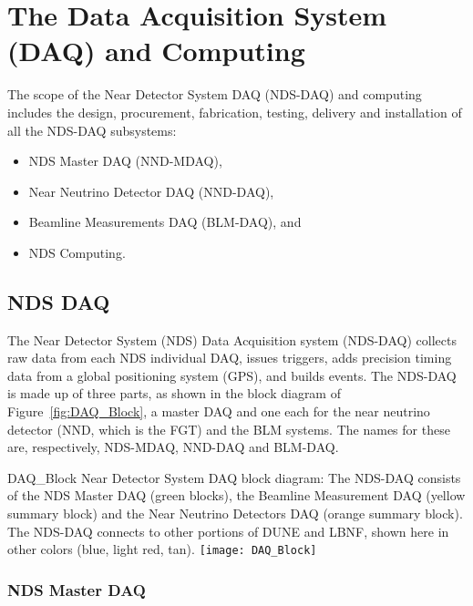 \section{The Data Acquisition System (DAQ) and Computing}
\label{cdrsec:detectors-nd-ref-daq-comp}

The scope of the Near Detector System DAQ (NDS-DAQ) and computing includes the
design, procurement, fabrication, testing, delivery and installation
of all the NDS-DAQ subsystems:
\begin{itemize}
\item NDS Master DAQ (NND-MDAQ),
\item Near Neutrino Detector DAQ (NND-DAQ),
\item Beamline Measurements DAQ (BLM-DAQ), and
\item NDS Computing.
\end{itemize}



\subsection{NDS DAQ}
\label{cdrsec:nd-gdaq-intro}

The Near Detector System (NDS) Data Acquisition system (NDS-DAQ)
collects raw data from each NDS individual DAQ, issues
triggers, adds precision timing data from a global positioning system
(GPS), and builds events.  The NDS-DAQ is made up of three parts, as
shown in the block diagram of Figure~\ref{fig:DAQ_Block}, a master DAQ
and one each for the near neutrino detector (NND, which is the FGT)
and the BLM systems. The names for these are, respectively, NDS-MDAQ,
NND-DAQ and BLM-DAQ.
\begin{cdrfigure}{DAQ_Block}
{Near Detector System DAQ block diagram: The NDS-DAQ consists 
of the NDS Master DAQ (green blocks), the Beamline Measurement DAQ (yellow summary 
block) and the Near Neutrino Detectors DAQ (orange summary block).  The 
NDS-DAQ connects to other portions of DUNE and LBNF, shown here in other colors (blue, 
light red, tan).}
\texttt{[image: DAQ\_Block]}
\end{cdrfigure}

\subsubsection{NDS Master DAQ} 
\label{cdrsec:nd-master-daq}

